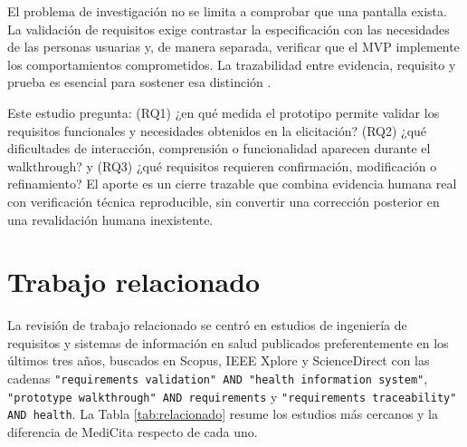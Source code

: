 \documentclass[runningheads]{llncs}
\begin{document}
	El problema de investigación no se limita a comprobar que una pantalla exista. La validación de requisitos exige contrastar la especificación con las necesidades de las personas usuarias y, de manera separada, verificar que el MVP implemente los comportamientos comprometidos. La trazabilidad entre evidencia, requisito y prueba es esencial para sostener esa distinción \cite{gotel1994,ramesh2001}.
	
	Este estudio pregunta: (RQ1) ¿en qué medida el prototipo permite validar los requisitos funcionales y necesidades obtenidos en la elicitación? (RQ2) ¿qué dificultades de interacción, comprensión o funcionalidad aparecen durante el walkthrough? y (RQ3) ¿qué requisitos requieren confirmación, modificación o refinamiento? El aporte es un cierre trazable que combina evidencia humana real con verificación técnica reproducible, sin convertir una corrección posterior en una revalidación humana inexistente.
	
	\section{Trabajo relacionado}
	
	La revisión de trabajo relacionado se centró en estudios de ingeniería de requisitos y sistemas de información en salud publicados preferentemente en los últimos tres años, buscados en Scopus, IEEE Xplore y ScienceDirect con las cadenas \texttt{"requirements validation" AND "health information system"}, \texttt{"prototype walkthrough" AND requirements} y \texttt{"requirements traceability" AND health}. La Tabla \ref{tab:relacionado} resume los estudios más cercanos y la diferencia de MediCita respecto de cada uno.
	
\end{document}
